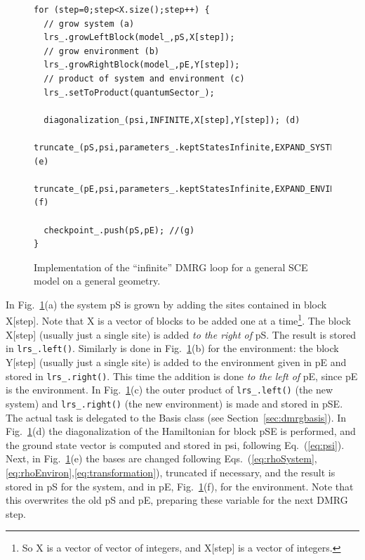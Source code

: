 \documentclass[paper=letter]{scrartcl}
\newcommand{\cppClass}[1]{{\sffamily #1}}
\begin{document}
\begin{figure}
\begin{lstlisting}
for (step=0;step<X.size();step++) {
  // grow system (a)		
  lrs_.growLeftBlock(model_,pS,X[step]);
  // grow environment (b)
  lrs_.growRightBlock(model_,pE,Y[step]); 
  // product of system and environment (c)   
  lrs_.setToProduct(quantumSector_);
  
  diagonalization_(psi,INFINITE,X[step],Y[step]); (d)
  truncate_(pS,psi,parameters_.keptStatesInfinite,EXPAND_SYSTEM); (e)
  truncate_(pE,psi,parameters_.keptStatesInfinite,EXPAND_ENVIRON); (f)
  
  checkpoint_.push(pS,pE); //(g)
}
\end{lstlisting}
\caption{\label{fig:infiniteloop}Implementation of the ``infinite'' DMRG loop for a general SCE model
 on a general geometry.}
\end{figure}
In Fig.~\ref{fig:infiniteloop}(a) the system pS is grown by adding the sites contained in block X[step]. Note that X is a vector of blocks to 
be added one at a time\footnote{So X is a vector of vector of integers, and 
X[step] is a vector of integers.}.  The block X[step] (usually just a single site)
is  added \emph{to the right of} pS.  The result is stored in \verb!lrs_.left()!.
Similarly is done in Fig.~\ref{fig:infiniteloop}(b) for the environment: the block Y[step]  (usually just a single site) is added to the environment
 given in pE and stored in \verb!lrs_.right()!. 
This time the addition is
done \emph{to the left of} pE, since pE is the environment.
In Fig.~\ref{fig:infiniteloop}(c) the outer product of \verb!lrs_.left()! (the new system) and \verb!lrs_.right()! (the new environment) is made and stored in pSE. 
The actual task is delegated to the \cppClass{Basis} class (see Section~\ref{sec:dmrgbasis}).
In Fig.~\ref{fig:infiniteloop}(d) the diagonalization of the Hamiltonian for block pSE is performed, 
and the ground state vector is computed and stored in psi, following Eq.~(\ref{eq:psi}). %
Next, in Fig.~\ref{fig:infiniteloop}(e) the bases are changed 
following Eqs.~(\ref{eq:rhoSystem},\ref{eq:rhoEnviron},\ref{eq:transformation}),  truncated if necessary, and the result is stored in 
pS for the system, and in pE, Fig.~\ref{fig:infiniteloop}(f),
for the environment. Note that this overwrites the old pS and pE, preparing these variable for the next DMRG step.
\end{document}
